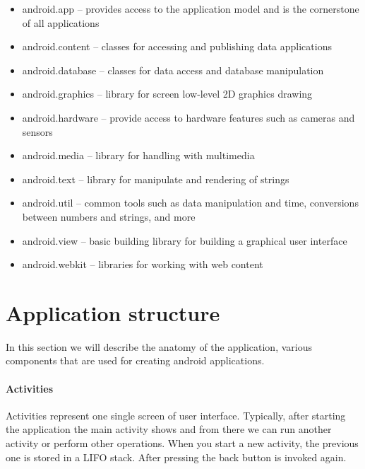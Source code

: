 \begin{itemize}
\item android.app -- provides access to the application model and is the cornerstone of all applications
\item android.content -- classes for accessing and publishing data applications
\item android.database -- classes for data access and database manipulation 
\item android.graphics -- library for screen low-level 2D graphics drawing
\item android.hardware -- provide access to hardware features such as cameras and sensors
\item android.media -- library for handling with multimedia 
\item android.text -- library for manipulate and rendering of strings
\item android.util -- common tools such as data manipulation and time, conversions between numbers and strings, and more
\item android.view -- basic building library for building a graphical user interface
\item android.webkit -- libraries for working with web content
\end{itemize}

\section{Application structure}\label{AppStructure}
In this section we will describe the anatomy of the application, various components that are used for creating android applications.

\paragraph{Activities}%
Activities represent one single screen of user interface. Typically, after starting the application the main activity shows and from there we can run another activity or perform other operations. When you start a new activity, the previous one is stored in a LIFO stack. After pressing the back button is invoked again.

